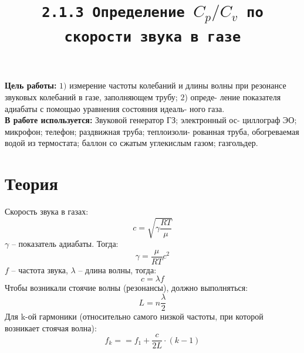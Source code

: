 \documentclass[11pt,a4paper]{article}
\title{\texttt{2.1.3 Определение $C_p /C_v$ по скорости звука в газе}}\date{}\author{}
\begin{document}
\maketitle
  \textbf{Цель работы:} $1)$ измерение частоты колебаний и длины волны при
  резонансе звуковых колебаний в газе, заполняющем трубу; $2$) опреде-
  ление показателя адиабаты с помощью уравнения состояния идеаль-
  ного газа.\\
  \textbf{В работе используется:} Звуковой генератор ГЗ; электронный ос-
  циллограф ЭО; микрофон; телефон; раздвижная труба; теплоизоли-
  рованная труба, обогреваемая водой из термостата; баллон со сжатым
  углекислым газом; газгольдер.

\section*{Теория}
  Скорость звука в газах: 
  \begin{equation*}
    c = \sqrt{\gamma\frac{RT}{\mu}}
  \end{equation*}
  $\gamma$ -- показатель адиабаты.
  Тогда:
  \begin{equation*}
    \gamma = \frac{\mu}{RT}c^2
  \end{equation*}
  $f$ -- частота звука, $\lambda$ -- длина волны, тогда:
  \begin{equation*}
    c = \lambda f
  \end{equation*}
  Чтобы возникали стоячие волны (резонансы), должно выполняться:
  \begin{equation*}
    L = n\frac{\lambda}{2}
  \end{equation*}
  Для k-ой гармоники (относительно самого низкой частоты, при которой возникает стоячая волна):
  \begin{equation*}
    f_k= = f_1 + \frac{c}{2L} \cdot (k - 1)
  \end{equation*}
\end{document}
